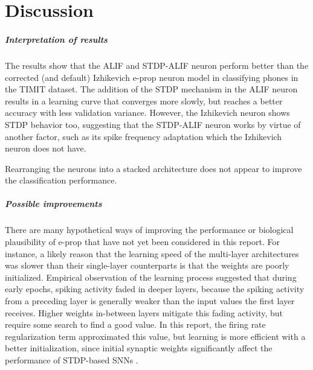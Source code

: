 \chapter{Discussion}\label{ch:discussion}

\paragraph{Interpretation of results}
The results show that the ALIF and STDP-ALIF neuron perform better than the corrected (and default) Izhikevich e-prop neuron model in classifying phones in the TIMIT dataset.
The addition of the STDP mechanism in the ALIF neuron results in a learning curve that converges more slowly, but reaches a better accuracy with less validation variance.
However, the Izhikevich neuron shows STDP behavior too, suggesting that the STDP-ALIF neuron works by virtue of another factor, such as its spike frequency adaptation which the Izhikevich neuron does not have.

Rearranging the neurons into a stacked architecture does not appear to improve the classification performance.

\paragraph{Possible improvements}
    There are many hypothetical ways of improving the performance or biological plausibility of e-prop that have not yet been considered in this report.
    For instance, a likely reason that the learning speed of the multi-layer architectures was slower than their single-layer counterparts is that the weights are poorly initialized.
    Empirical observation of the learning process suggested that during early epochs, spiking activity faded in deeper layers, because the spiking activity from a preceding layer is generally weaker than the input values the first layer receives.
    Higher weights in-between layers mitigate this fading activity, but require some search to find a good value.
    In this report, the firing rate regularization term approximated this value, but learning is more efficient with a better initialization, since initial synaptic weights significantly affect the performance of STDP-based SNNs \citep{kim2020initial}.


